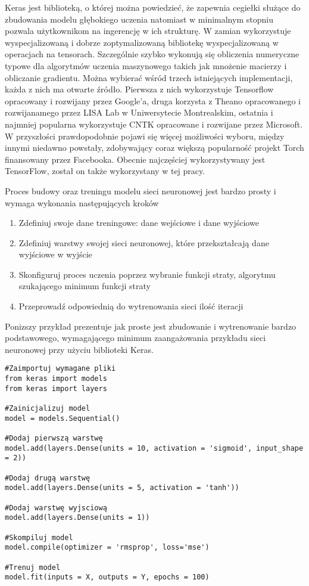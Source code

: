 \documentclass[11pt]{book}
\theoremstyle{definition}
\begin{document}
Keras jest biblioteką, o której można powiedzieć, że zapewnia cegiełki służące do zbudowania modelu głębokiego uczenia natomiast w minimalnym stopniu pozwala użytkownikom na ingerencję w ich strukturę. W zamian wykorzystuje wyspecjalizowaną i dobrze zoptymalizowaną bibliotekę wyspecjalizowaną w operacjach na tensorach. Szczególnie szybko wykonują się obliczenia numeryczne typowe dla algorytmów uczenia maszynowego takich jak mnożenie macierzy i obliczanie gradientu.  Można wybierać wśród trzech istniejących implementacji, każda z nich ma otwarte źródło. Pierwsza z nich wykorzystuje Tensorflow opracowany i rozwijany przez Google'a, druga korzysta z Theano opracowanego i rozwijanamego przez LISA Lab w Uniwersytecie Montrealskim, ostatnia i najmniej popularna wykorzystuje CNTK opracowane i rozwijane przez Microsoft. W przyszłości prawdopodobnie pojawi się więcej możliwości wyboru, między innymi niedawno powstały, zdobywający coraz większą popularność projekt Torch finansowany przez Facebooka. Obecnie najczęściej wykorzystywany jest TensorFlow, został on także wykorzystany w tej pracy. 
%

Proces budowy oraz treningu modelu sieci neuronowej jest bardzo prosty i wymaga wykonania następujących kroków
\begin{enumerate}
	\setlength\itemsep{0.em}
	\item Zdefiniuj swoje dane treningowe: dane wejściowe i dane wyjściowe
	\item Zdefiniuj warstwy swojej sieci neuronowej, które przekształcają dane wyjściowe w wyjście
	\item Skonfiguruj proces uczenia poprzez wybranie funkcji straty, algorytmu szukającego minimum funkcji straty
	\item Przeprowadź odpowiednią do wytrenowania sieci ilość iteracji
\end{enumerate}

Ponizszy przykład prezentuje jak proste jest zbudowanie i wytrenowanie bardzo podstawowego, wymagającego minimum zaangażowania przykładu sieci neuronowej przy użyciu biblioteki Keras.


%
\begin{lstlisting}
#Zaimportuj wymagane pliki
from keras import models
from keras import layers

#Zainicjalizuj model
model = models.Sequential()

#Dodaj pierwszą warstwę
model.add(layers.Dense(units = 10, activation = 'sigmoid', input_shape = 2))

#Dodaj drugą warstwę
model.add(layers.Dense(units = 5, activation = 'tanh'))

#Dodaj warstwę wyjsciową
model.add(layers.Dense(units = 1))

#Skompiluj model
model.compile(optimizer = 'rmsprop', loss='mse')

#Trenuj model
model.fit(inputs = X, outputs = Y, epochs = 100)
\end{lstlisting}
\end{document}
